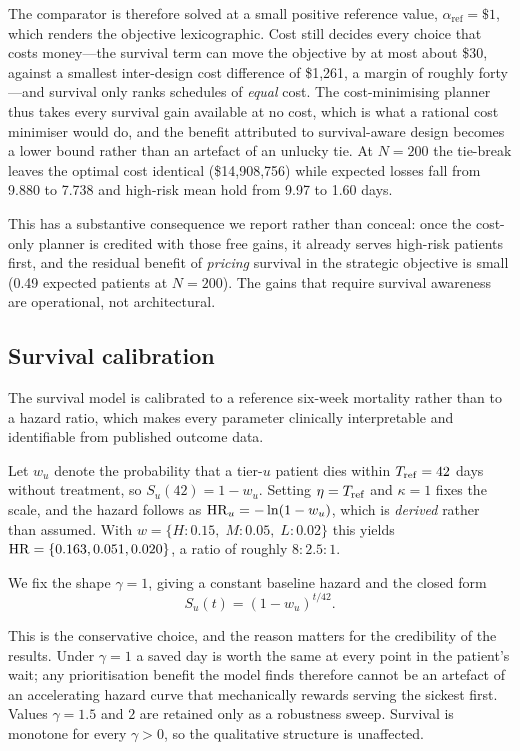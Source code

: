 The comparator is therefore solved at a small positive reference value,
$\alpha_{\mathrm{ref}} = \$1$, which renders the objective lexicographic. Cost
still decides every choice that costs money---the survival term can move the
objective by at most about \$30, against a smallest inter-design cost difference
of \$1{,}261, a margin of roughly forty---and survival only ranks schedules of
\emph{equal} cost. The cost-minimising planner thus takes every survival gain
available at no cost, which is what a rational cost minimiser would do, and the
benefit attributed to survival-aware design becomes a lower bound rather than an
artefact of an unlucky tie. At $N = 200$ the tie-break leaves the optimal cost
identical (\$14{,}908{,}756) while expected losses fall from 9.880 to 7.738 and
high-risk mean hold from 9.97 to 1.60 days.

This has a substantive consequence we report rather than conceal: once the
cost-only planner is credited with those free gains, it already serves high-risk
patients first, and the residual benefit of \emph{pricing} survival in the
strategic objective is small (0.49 expected patients at $N = 200$). The gains
that require survival awareness are operational, not architectural.

\subsection{Survival calibration}
\label{sec:calibration}

The survival model is calibrated to a reference six-week mortality rather than
to a hazard ratio, which makes every parameter clinically interpretable and
identifiable from published outcome data.

Let $w_u$ denote the probability that a tier-$u$ patient dies within $T_{\mathrm{ref}} =
42$ days without treatment, so $S_u(42) = 1 - w_u$. Setting $\eta = T_{\mathrm{ref}}$ and
$\kappa = 1$ fixes the scale, and the hazard follows as $\mathrm{HR}_u = -\ln(1 -
w_u)$, which is \emph{derived} rather than assumed. With $w = \{H\!: 0.15,\;
M\!: 0.05,\; L\!: 0.02\}$ this yields $\mathrm{HR} = \{0.163, 0.051, 0.020\}$, a ratio
of roughly $8 : 2.5 : 1$.

We fix the shape $\gamma = 1$, giving a constant baseline hazard and the closed
form
\begin{equation}
  S_u(t) = (1 - w_u)^{t/42}. \label{eq:closedform}
\end{equation}

This is the conservative choice, and the reason matters for the credibility of
the results. Under $\gamma = 1$ a saved day is worth the same at every point in
the patient's wait; any prioritisation benefit the model finds therefore cannot
be an artefact of an accelerating hazard curve that mechanically rewards
serving the sickest first. Values $\gamma = 1.5$ and $2$ are retained only as a
robustness sweep. Survival is monotone for every $\gamma > 0$, so the
qualitative structure is unaffected.

